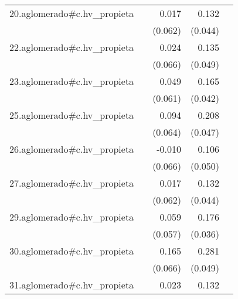 {\begin{longtable}{l*{4}{D{.}{.}{-1}}}
\addlinespace
20.aglomerado#c.hv\_propieta&                     &       0.017         &       0.132\sym{**} &                     \\
            &                     &     (0.062)         &     (0.044)         &                     \\
\addlinespace
22.aglomerado#c.hv\_propieta&                     &       0.024         &       0.135\sym{**} &                     \\
            &                     &     (0.066)         &     (0.049)         &                     \\
\addlinespace
23.aglomerado#c.hv\_propieta&                     &       0.049         &       0.165\sym{***}&                     \\
            &                     &     (0.061)         &     (0.042)         &                     \\
\addlinespace
25.aglomerado#c.hv\_propieta&                     &       0.094         &       0.208\sym{***}&                     \\
            &                     &     (0.064)         &     (0.047)         &                     \\
\addlinespace
26.aglomerado#c.hv\_propieta&                     &      -0.010         &       0.106\sym{*}  &                     \\
            &                     &     (0.066)         &     (0.050)         &                     \\
\addlinespace
27.aglomerado#c.hv\_propieta&                     &       0.017         &       0.132\sym{**} &                     \\
            &                     &     (0.062)         &     (0.044)         &                     \\
\addlinespace
29.aglomerado#c.hv\_propieta&                     &       0.059         &       0.176\sym{***}&                     \\
            &                     &     (0.057)         &     (0.036)         &                     \\
\addlinespace
30.aglomerado#c.hv\_propieta&                     &       0.165\sym{*}  &       0.281\sym{***}&                     \\
            &                     &     (0.066)         &     (0.049)         &                     \\
\addlinespace
31.aglomerado#c.hv\_propieta&                     &       0.023         &       0.132\sym{**} &                     \\

\end{longtable}}
